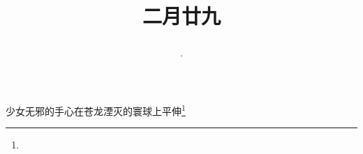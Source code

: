 \title{\date[d=7,m=4,y=2024][year:cn-y,年,month:cn,day:cn,日,·,weekday]·二月廿九 }
少女无邪的手心在苍龙湮灭的寰球上平伸\footnote{ }

